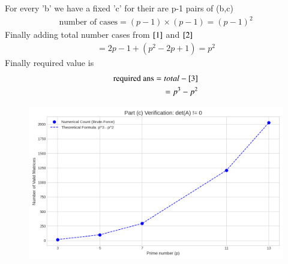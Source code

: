 \documentclass[journal]{IEEEtran}
\begin{document}
For every 'b' we have a fixed 'c' for their are p-1 pairs of (b,c)
\begin{align}
    \text{number of cases}= (p-1)\times(p-1)=(p-1)^2 \label{2}
\end{align}
Finally adding total number cases from $\eqref{1}$ and $\eqref{2}$
\begin{align}
    =2p-1+(p^2-2p+1)
    =p^2 \label{3}
\end{align}
Finally required value is
\begin{align}
    \text{required ans}=total - \eqref{3}\\
    = p^3-p^2
\end{align}
\begin{figure}[H]
    \centering
    \includegraphics[width=\columnwidth]{figs/figure_c.png}
    \caption{}
    \label{fig:placeholder}
\end{figure}
\end{document}
